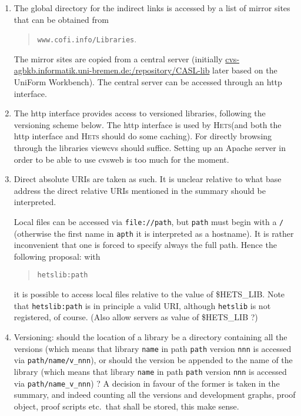 \documentclass{article}
\newcommand{\Hets}{\textmd{\textsc{Hets}}\xspace }
\begin{document}
\begin{enumerate}
\item 
The global directory for the indirect links is accessed by a list of
mirror sites that can be obtained from 
\begin{quote}\texttt{www.cofi.info/Libraries}.\end{quote} 
The
mirror sites are copied from a central server (initially
\url{cvs-agbkb.informatik.uni-bremen.de:/repository/CASL-lib}
later based on the UniForm Workbench). 
The central server can be accessed through an http interface. 

\item
The http interface provides access to versioned libraries,
following the versioning scheme below.
The http interface is
used by \Hets (and both the http interface and \Hets should do some
caching). For directly browsing through the libraries viewcvs should
suffice. Setting up an Apache server in order to be able to use cvsweb
is too much for the moment.
\label{global-server}

\item 
Direct absolute URIs are taken as such. 
It is unclear relative to what base address the direct relative
URIs mentioned in the summary should be interpreted.

Local files can be accessed via \texttt{file://path},
but \texttt{path} must begin with a \texttt{/}
(otherwise the first name in \texttt{apth} it is interpreted as a hostname).
It is rather inconvenient that one is forced to specify
always the full path.
Hence the following proposal: with
\begin{quote}\texttt{hetslib:path}\end{quote}
it is possible to access local files relative to the value of \$HETS\_LIB.
Note that \texttt{hetslib:path} is in principle a valid URI,
although \texttt{hetslib} is not registered, of course.
(Also allow servers as value of \$HETS\_LIB ?)

\item 
Versioning: should the location of a library be a directory
containing all the versions (which means that library
\texttt{name} in path \texttt{path} version \texttt{nnn} is accessed via \texttt{path/name/v\_nnn}), 
or should the version be appended to the name of the library (which
means that library \texttt{name} in path \texttt{path} version \texttt{nnn} is accessed via
\texttt{path/name\_v\_nnn}) ? 
A decision in favour of the former is taken in the summary, and
indeed counting all the versions and development graphs, proof object, proof scripts
etc.\ that shall be stored, this make sense.


\end{enumerate}
\end{document}
